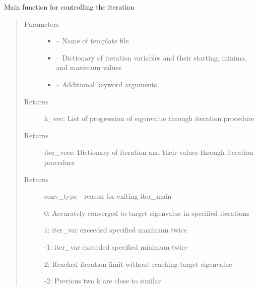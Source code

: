 \documentclass[letterpaper,10pt,english]{sphinxmanual}
\begin{document}
\begin{fulllineitems}
\label{\detokenize{iterator:critops.iterator.itermain}}
Main function for controlling the iteration
\begin{quote}\begin{description}
\item[{Parameters}] \leavevmode\begin{itemize}
\item {} 
 -- Name of template file

\item {} 
 -- Dictionary of iteration variables and their starting, minima, and maximum values

\item {} 
 -- Additional keyword arguments

\end{itemize}

\item[{Returns}] \leavevmode
k\_vec: List of progression of eigenvalue through iteration procedure

\item[{Returns}] \leavevmode
iter\_vecs: Dictionary of iteration and their values through iteration procedure

\item[{Returns}] \leavevmode

conv\_type - reason for exiting iter\_main

0: Accurately converged to target eigenvalue in specified iterations

1: iter\_var exceeded specified maximum twice

-1: iter\_var exceeded specified minimum twice

2: Reached iteration limit without reaching target eigenvalue

-2: Previous two k are close to similar


\end{description}\end{quote}

\end{fulllineitems}

\end{document}
